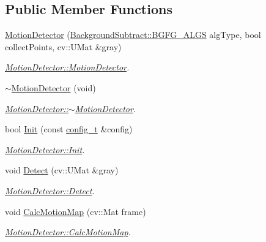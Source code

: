 \subsection*{Public Member Functions}
\begin{DoxyCompactItemize}
\item 
\mbox{\hyperlink{class_motion_detector_a0df27eabc4f6d1cb55dc610dafa6a31f}{Motion\+Detector}} (\mbox{\hyperlink{class_background_subtract_a56850081696df68b55f87b4f3d87949f}{Background\+Subtract\+::\+B\+G\+F\+G\+\_\+\+A\+L\+GS}} alg\+Type, bool collect\+Points, cv\+::\+U\+Mat \&gray)
\begin{DoxyCompactList}\small\item\em \mbox{\hyperlink{class_motion_detector_a0df27eabc4f6d1cb55dc610dafa6a31f}{Motion\+Detector\+::\+Motion\+Detector}}. \end{DoxyCompactList}\item 
\mbox{\hyperlink{class_motion_detector_ad825ac5d27f840f3f6abcc0409aea71e}{$\sim$\+Motion\+Detector}} (void)
\begin{DoxyCompactList}\small\item\em \mbox{\hyperlink{class_motion_detector_ad825ac5d27f840f3f6abcc0409aea71e}{Motion\+Detector\+::$\sim$\+Motion\+Detector}}. \end{DoxyCompactList}\item 
bool \mbox{\hyperlink{class_motion_detector_af59eda71fe52b578c08472425182dc41}{Init}} (const \mbox{\hyperlink{defines_8h_a81d657237a541d02f8eeefdd40191920}{config\+\_\+t}} \&config)
\begin{DoxyCompactList}\small\item\em \mbox{\hyperlink{class_motion_detector_af59eda71fe52b578c08472425182dc41}{Motion\+Detector\+::\+Init}}. \end{DoxyCompactList}\item 
void \mbox{\hyperlink{class_motion_detector_aac68875ab09d4436391855e2df4e0e06}{Detect}} (cv\+::\+U\+Mat \&gray)
\begin{DoxyCompactList}\small\item\em \mbox{\hyperlink{class_motion_detector_aac68875ab09d4436391855e2df4e0e06}{Motion\+Detector\+::\+Detect}}. \end{DoxyCompactList}\item 
void \mbox{\hyperlink{class_motion_detector_aa4e606acafdc33a3104471903e449adc}{Calc\+Motion\+Map}} (cv\+::\+Mat frame)
\begin{DoxyCompactList}\small\item\em \mbox{\hyperlink{class_motion_detector_aa4e606acafdc33a3104471903e449adc}{Motion\+Detector\+::\+Calc\+Motion\+Map}}. \end{DoxyCompactList}\item 

\end{DoxyCompactItemize}
